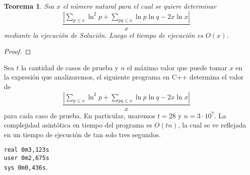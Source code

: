 \documentclass{article}
\newcommand\cppfile[2][]{}
\newtheorem{theorem}{Teorema}
\theoremstyle{definition}
\theoremstyle{remark}
\begin{document}
\begin{theorem}
Sea $x$ el n\'umero natural para el cual se quiere determinar
$$\frac{|\sum_{p \leq x} \ln^2 p + \sum_{pq \leq x} \ln p \ln q - 2x\ln x|}{x}$$
mediante la ejecuci\'on de Soluci\'on.
Luego el tiempo de ejecuci\'on es $O(x)$.
\end{theorem}

\begin{proof}
\end{proof}

Sea $t$ la cantidad de casos de prueba y $n$ el m\'aximo valor que puede tomar $x$ en la expresi\'on que analizaremos,
el siguiente programa en C++ determina el valor de 
$$\frac{|\sum_{p \leq x} \ln^2 p + \sum_{pq \leq x} \ln p \ln q - 2x\ln x|}{x}$$
para cada caso de prueba.
En particular, usaremos $t = 28$ y $n = 3 \cdot 10^7$.
La complejidad asint\'otica en tiempo del programa es $O(tn)$, la cual se ve reflejada en un tiempo de ejecuci\'on
de tan solo tres segundos.

\begin{center}
    \texttt{real	0m3,123s}\\
    \texttt{user	0m2,675s}\\
    \texttt{sys	0m0,436s}.
\end{center}

\cppfile{formula_selberg.cpp}
\end{document}
